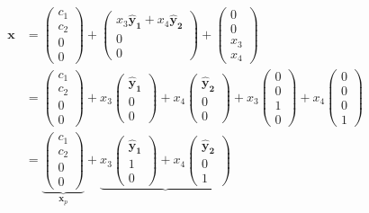 \begin{itemize}
\begin{align}
\bm x &= \begin{pmatrix}
c_1\\c_2\\0\\0
\end{pmatrix} +  \begin{pmatrix}
x_3\bm{\hat y_1} + x_4\bm{\hat y_2}\\0\\0
\end{pmatrix} + \begin{pmatrix}
0\\0\\x_3\\x_4
\end{pmatrix}\\
&=\begin{pmatrix}
c_1\\c_2\\0\\0
\end{pmatrix} +  x_3\begin{pmatrix}
\bm{\hat y_1}\\0\\0
\end{pmatrix}+x_4\begin{pmatrix}
\bm{\hat y_2}\\0\\0
\end{pmatrix} + x_3\begin{pmatrix}
0\\0\\1\\0
\end{pmatrix} + x_4\begin{pmatrix}
0\\0\\0\\1
\end{pmatrix}\\
&=\underbrace{\begin{pmatrix}
c_1\\c_2\\0\\0
\end{pmatrix}}_{\bm x_p}
+\underbrace{x_3\begin{pmatrix}
\bm{\hat y_1}\\1\\0
\end{pmatrix} + x_4\begin{pmatrix}
\bm{\hat y_2}\\0\\1

\end{pmatrix}}
\end{align}
\end{itemize}

